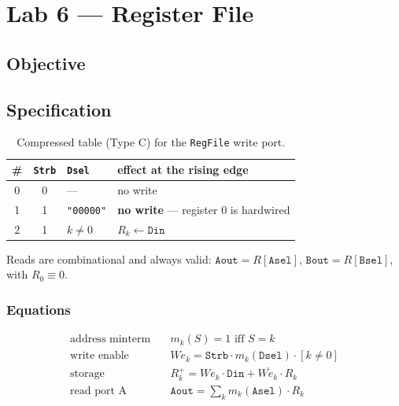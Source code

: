 
\chapter{Lab 6 --- Register File}

\section{Objective}

\section{Specification}

\begin{table}[htbp]
\centering
\caption{Compressed table (Type C) for the \texttt{RegFile} write port.}
\label{tab:lab06-truth}
\begin{tabular}{ccl||l}
\toprule
\# & \texttt{Strb} & \texttt{Dsel} & effect at the rising edge \\
\midrule
0 & 0 & --- & no write \\
1 & 1 & \texttt{"00000"} & \textbf{no write} --- register 0 is hardwired \\
2 & 1 & $k \neq 0$ & $R_k \leftarrow \texttt{Din}$ \\
\bottomrule
\end{tabular}
\end{table}

Reads are combinational and always valid:
$\texttt{Aout} = R[\texttt{Asel}]$, $\texttt{Bout} = R[\texttt{Bsel}]$,
with $R_0 \equiv 0$.

\subsection*{Equations}

\begin{align*}
\text{address minterm} \quad & m_k(S) = 1 \text{ iff } S = k \\
\text{write enable}    \quad & \mathit{We}_k = \texttt{Strb} \cdot m_k(\texttt{Dsel}) \cdot [k \neq 0] \\
\text{storage}         \quad & R_k^{+} = \mathit{We}_k \cdot \texttt{Din} + \overline{\mathit{We}_k} \cdot R_k \\
\text{read port A}     \quad & \texttt{Aout} = \sum_{k} m_k(\texttt{Asel}) \cdot R_k
\end{align*}

